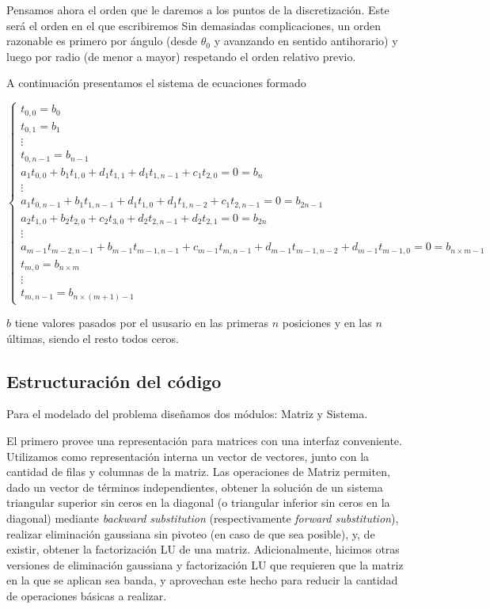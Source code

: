 Pensamos ahora el orden que le daremos a los puntos de la discretización. Este será el orden en el que escribiremos  Sin demasiadas complicaciones, un orden razonable es primero por ángulo (desde $\theta_0$ y avanzando en sentido antihorario) y luego por radio (de menor a mayor) respetando el orden relativo previo.

A continuación presentamos el sistema de ecuaciones formado 

\begin{equation}
\label{sisecu}
  \left\lbrace
  \begin{array}{l}
     t_{0,0} = b_0 \\
     t_{0,1} = b_1 \\
     \vdots\\
     t_{0,n-1} = b_{n-1} \\
		 a_1 t_{0,0} + b_1 t_{1,0} + d_1 t_{1, 1} + d_1 t_{1, n-1} + c_1 t_{2, 0} = 0 = b_{n}\\
		 \vdots\\
		 a_1 t_{0,n-1} + b_1 t_{1,n-1} + d_1 t_{1, 0} + d_1 t_{1, n-2} + c_1 t_{2, n-1} = 0= b_{2n - 1}\\
		 a_2 t_{1,0} + b_2 t_{2,0} + c_2 t_{3, 0} + d_2 t_{2, n-1} + d_2 t_{2, 1} = 0 = b_{2n}\\
		 \vdots\\
		 a_{m-1} t_{m-2,n-1} + b_{m-1} t_{m-1,n-1} + c_{m-1} t_{m, n-1} + d_{m-1} t_{m-1, n-2} + d_{m-1} t_{m-1, 0} = 0 = b_{n\times m -1}\\
		 t_{m,0} = b_{n\times m}\\
		 \vdots\\
		 t_{m, n-1} = b_{n\times (m+1)-1}
		 
  \end{array}
  \right.
\end{equation}

$b$ tiene valores pasados por el ususario en las primeras $n$ posiciones y en las $n$ últimas, siendo el resto todos ceros.




\subsection{Estructuración del código}
Para el modelado del problema diseñamos dos módulos: Matriz y Sistema. 

El primero provee una representación para matrices con una interfaz conveniente. Utilizamos como representación interna un vector de vectores, junto con la cantidad de filas y columnas de la matriz. Las operaciones de Matriz permiten, dado un vector de términos independientes, obtener la solución de un sistema triangular superior sin ceros en la diagonal (o triangular inferior sin ceros en la diagonal) mediante \textit{backward substitution} (respectivamente \textit{forward substitution}), realizar eliminación gaussiana sin pivoteo (en caso de que sea posible), y, de existir, obtener la factorización LU de una matriz. Adicionalmente, hicimos otras versiones de eliminación gaussiana y factorización LU que requieren que la matriz en la que se aplican sea banda, y aprovechan este hecho para reducir la cantidad de operaciones básicas a realizar.\\
